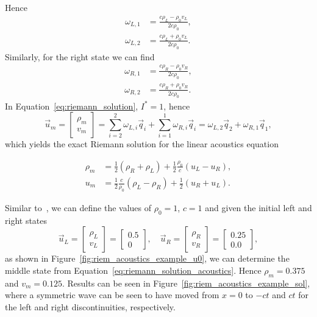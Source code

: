 Hence
\begin{align}
	\omega_{L,1} &= \frac{c \rho_L - \rho_0 v_L}{2 c \rho_0}, \\
	\omega_{L,2} &= \frac{c \rho_L + \rho_0 v_L}{2 c \rho_0}.
\end{align}
Similarly, for the right state we can find
\begin{align}
	\omega_{R,1} &= \frac{c \rho_R - \rho_0 v_R}{2 c \rho_0}, \\
	\omega_{R,2} &= \frac{c \rho_R + \rho_0 v_R}{2 c \rho_0}.
\end{align}
In Equation~\ref{eq:riemann_solution}, $I^*=1$, hence
\begin{equation}
	\vec u_m = 
	\begin{bmatrix}
		\rho_m \\ v_m
	\end{bmatrix} =  \sum_{i=2}^2 \omega_{L,i} \vec q_i + \sum_{i=1}^{1} \omega_{R,i} \vec q_i = 
	\omega_{L,2} \vec q_2 + \omega_{R,1} \vec q_1,
\end{equation}
which yields the exact Riemann solution for the linear acoustics equation
\begin{eqBox}
	\begin{align}
		\rho_m &= \frac{1}{2} (\rho_R+\rho_L) + \frac{1}{2}\frac{\rho_0}{c} (u_L-u_R), \\
		u_m &= \frac{1}{2}\frac{c}{\rho_0}(\rho_L-\rho_R) + \frac{1}{2} (u_R+u_L).
		\label{eq:riemann_solution_acoustics}
	\end{align}
\end{eqBox}
Similar to~\cite{toroRiemannSolversEvolved2006}, we can define the values of $\rho_0=1$, $c=1$ and given the initial left and right states
\begin{equation}
	\vec u_L = 
	\begin{bmatrix}
		\rho_L \\ v_L
	\end{bmatrix}
	 = 	
	 \begin{bmatrix}
		0.5 \\ 0
	\end{bmatrix},
	\quad
	\vec u_R = 
	\begin{bmatrix}
		\rho_R \\ v_R
	\end{bmatrix}
	 = 	
	 \begin{bmatrix}
		0.25 \\ 0.0
	\end{bmatrix},
\end{equation}
as shown in Figure~\ref{fig:riem_acoustics_example_u0}, we can determine the middle state from Equation~\ref{eq:riemann_solution_acoustics}. Hence $\rho_m=0.375$ and $v_m=0.125$. Results can be seen in Figure~\ref{fig:riem_acoustics_example_sol}, where a symmetric wave can be seen to have moved from $x=0$ to $-ct$ and $ct$ for the left and right discontinuities, respectively. 
